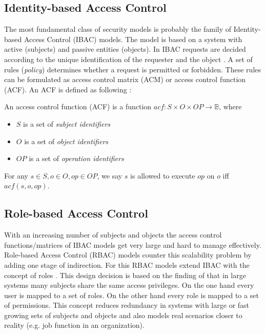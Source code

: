 \documentclass[twoside, openright, 12pt]{book}
\begin{document}
\subsection{Identity-based Access Control}
\label{IBAC}
The most fundamental class of security models is probably the family of Identity-based Access Control (IBAC) models.
The model is based on a system with active (subjects) and passive entities (objects).
In IBAC requests are decided according to the unique identification of the requester and the object \citep{Lampson74}.
A set of rules (\textit{policy}) determines whether a request is permitted or forbidden.
These rules can be formulated as access control matrix (ACM) or access control function (ACF).
An ACF is defined as following \citep{Amthor18}:

\begin{definition}
An access control function (ACF) is a function ${acf}: S \times O \times OP \rightarrow \mathbb{B}$, where
\vspace{-2mm}
\begin{itemize}
\item $S$ is a set of \textit{subject identifiers}
\item $O$ is a set of \textit{object identifiers}
\item $OP$ is a set of \textit{operation identifiers}
\end{itemize} 
\vspace{-2mm}
For any $s \in S, o \in O, op \in OP$, we say $s$ is allowed to execute $op$ on $o$ iff $acf(s,o,op)$.
\end{definition}



\subsection{Role-based Access Control}
\label{RBAC}
With an increasing number of subjects and objects the access control functions/matrices of IBAC models get very large and hard to manage effectively.
Role-based Access Control (RBAC) models counter this scalability problem by adding one stage of indirection.
For this RBAC models extend IBAC with the concept of roles \citep{Sandhu96}.
This design decision is based on the finding of \cite{Sandhu96} that in large systems many subjects share the same access privileges.
On the one hand every user is mapped to a set of roles.
On the other hand every role is mapped to a set of permissions.
This concept reduces redundancy in systems with large or fast growing sets of subjects and objects and also models real scenarios closer to reality (e.g. job function in an organization).
\end{document}
